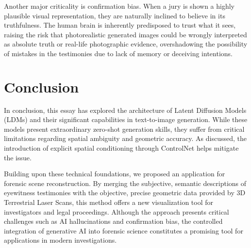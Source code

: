\documentclass[10pt,twocolumn,letterpaper]{article}
\begin{document}
Another major criticality is confirmation bias. When a jury is shown a highly plausible visual representation, they are naturally inclined to believe in its truthfulness. The human brain is inherently predisposed to trust what it sees, raising the risk that photorealistic generated images could be wrongly interpreted as absolute truth or real-life photographic evidence, overshadowing the possibility of mistakes in the testimonies due to lack of memory or deceiving intentions.

\section{Conclusion}

In conclusion, this essay has explored the architecture of Latent Diffusion Models (LDMs) and their significant capabilities in text-to-image generation. While these models present extraordinary zero-shot generation skills, they suffer from critical limitations regarding spatial ambiguity and geometric accuracy. As discussed, the introduction of explicit spatial conditioning through ControlNet helps mitigate the issue.

Building upon these technical foundations, we proposed an application for forensic scene reconstruction. By merging the subjective, semantic descriptions of eyewitness testimonies with the objective, precise geometric data provided by 3D Terrestrial Laser Scans, this method offers a new visualization tool for investigators and legal proceedings. Although the approach presents critical challenges such as AI hallucinations and confirmation bias, the controlled integration of generative AI into forensic science constitutes a promising tool for applications in modern investigations.


{\small


}
\end{document}
